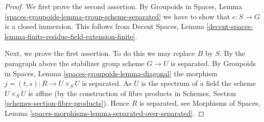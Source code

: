 \documentclass{stacks-project}
\theoremstyle{plain}
\theoremstyle{definition}
\theoremstyle{remark}
\numberwithin{equation}{subsection}
\begin{document}
\begin{proof}
We first prove the second assertion. By Groupoids in Spaces,
Lemma \ref{spaces-groupoids-lemma-group-scheme-separated}
we have to show that $e : S \to G$ is a closed immersion.
This follows from Decent Spaces, Lemma
\ref{decent-spaces-lemma-finite-residue-field-extension-finite}.

\medskip\noindent
Next, we prove the first assertion. To do this we may replace $B$ by $S$.
By the paragraph above the stabilizer group scheme $G \to U$ is separated. By
Groupoids in Spaces, Lemma \ref{spaces-groupoids-lemma-diagonal}
the morphism $j = (t, s) : R \to U \times_S U$ is separated.
As $U$ is the spectrum of a field the scheme
$U \times_S U$ is affine (by the construction of fibre products in
Schemes, Section \ref{schemes-section-fibre-products}).
Hence $R$ is separated, see
Morphisms of Spaces, Lemma
\ref{spaces-morphisms-lemma-separated-over-separated}.
\end{proof}
\end{document}
